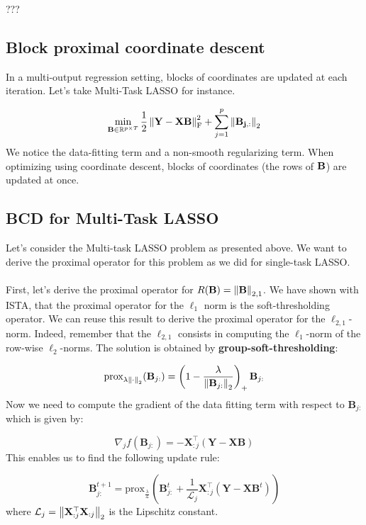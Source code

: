 \documentclass[a4paper,10pt]{article}
\theoremstyle{definition}
\begin{document}
???


\subsection*{Block proximal coordinate descent}

In a multi-output regression setting, blocks of coordinates are updated at each iteration. Let's take Multi-Task
LASSO for instance.

\begin{equation*}
    \min_{\mathbf{B} \in \mathbb{R}^{p \times T}}
    \frac{1}{2} \left \lVert \bf{Y - XB} \right \rVert^2_\text{F}
    + \sum_{j=1}^p \left \lVert \bf{B}_{j, :} \right \rVert_2
\end{equation*}
%
We notice the data-fitting term and a non-smooth regularizing term. When optimizing using
coordinate descent, blocks of coordinates (the rows of $\bf{B}$) are updated at once.

\subsection*{BCD for Multi-Task LASSO}

Let's consider the Multi-task LASSO problem as presented above. We want to derive the proximal operator
for this problem as we did for single-task LASSO.
\\
\\
First, let's derive the proximal operator for $R(\mathbf{B}) = \left \lVert \mathbf{B} \right \rVert_{2, 1}$.
We have shown with ISTA, that the proximal operator for the $\ell_1$ norm is the
soft-thresholding operator. We can reuse this result to derive the proximal operator for
the $\ell_{2,1}$-norm. Indeed, remember that the $\ell_{2,1}$ consists in computing the
$\ell_1$-norm of the row-wise $\ell_2$-norms. The solution is obtained by \textbf{group-soft-thresholding}:

\begin{equation*}
    \text{prox}_{\lambda \left \lVert \cdot \right \rVert_2}
    (\mathbf{B}_{j:}) =
    \left(
    1 - \frac{\lambda}{\left \lVert \mathbf{B}_{j:} \right \rVert_2}
    \right)_+
    \mathbf{B}_{j:}
\end{equation*}
%
Now we need to compute the gradient of the data fitting term with respect to $\mathbf{B}_{j:}$
which is given by:

\begin{equation*}
    \nabla_j f(\mathbf{B}_{j:})
    = -\mathbf{X}_{:j}^{\top}
    (\mathbf{Y} - \mathbf{XB})
\end{equation*}
%
This enables us to find the following update rule:

\begin{equation*}
    \mathbf{B}_{j:}^{t+1} =
    \text{prox}_{\frac{\lambda}{\mathcal{L}}}\left(
    \mathbf{B}_{j:}^{t}
    + \frac{1}{\mathcal{L}_j}
    \mathbf{X}_{:j}^{\top}
    (\mathbf{Y} - \mathbf{X}\mathbf{B}^t)
    \right)
\end{equation*}
%
where $\mathcal{L}_j = \left \lVert \mathbf{X}_{:j}^{\top}\mathbf{X}_{:j} \right \rVert_2$ is the Lipschitz constant.

\newpage


\end{document}
